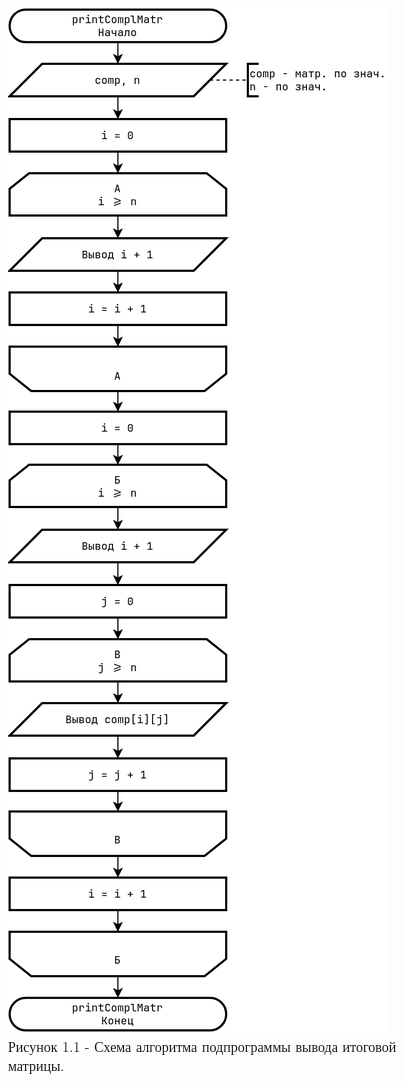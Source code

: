 \documentclass[oneside,a4paper,14pt]{extarticle}
\begin{document}
\clearpage
\begin{figure}[H]
	\centering
	\includegraphics[height=0.9\textheight]{pics/flowchart2.png}
	\caption*{Рисунок 1.1 - Схема алгоритма подпрограммы вывода итоговой матрицы.}
\end{figure}
\end{document}
